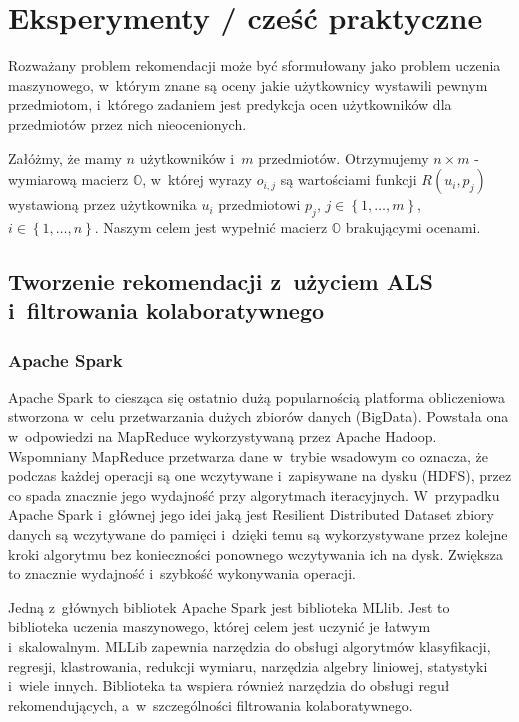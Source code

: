 \documentclass[12pt,a4paper]{report}
\newcommand{\set}[1]{\left\lbrace {#1} \right\rbrace}
\begin{document}
\chapter{Eksperymenty / cześć praktyczne}

Rozważany problem rekomendacji może być sformułowany jako problem uczenia maszynowego, w~którym znane są oceny jakie użytkownicy wystawili pewnym przedmiotom, i~którego zadaniem jest predykcja ocen użytkowników dla przedmiotów przez nich nieocenionych. 

Załóżmy, że mamy $n$ użytkowników i~$m$ przedmiotów. Otrzymujemy $n \times m$ - wymiarową macierz $\mathbb{O}$, w~której wyrazy $o_{i,j}$ są wartościami funkcji $R(u_i,p_j)$ wystawioną przez użytkownika $u_i$ przedmiotowi $p_j$, $j \in \set{1, \ldots, m}$, $i \in \set{1, \ldots, n}$. Naszym celem jest wypełnić macierz $\mathbb{O}$ brakującymi ocenami. 


\section{Tworzenie rekomendacji z~użyciem ALS i~filtrowania kolaboratywnego}
\subsection{Apache Spark}
Apache Spark to ciesząca się ostatnio dużą popularnością platforma obliczeniowa stworzona w~celu przetwarzania dużych zbiorów danych (BigData). Powstała ona w~odpowiedzi na MapReduce wykorzystywaną przez Apache Hadoop. Wspomniany MapReduce przetwarza dane w~trybie wsadowym co oznacza, że podczas każdej operacji są one wczytywane i~zapisywane na dysku (HDFS), przez co spada znacznie jego wydajność przy algorytmach iteracyjnych. W~przypadku Apache Spark i~głównej jego idei jaką jest 
Resilient Distributed Dataset zbiory danych są wczytywane do pamięci i~dzięki temu są wykorzystywane przez kolejne kroki algorytmu bez konieczności ponownego wczytywania ich na dysk. Zwiększa to znacznie wydajność i~szybkość wykonywania operacji.

Jedną z~głównych bibliotek Apache Spark jest biblioteka MLlib. Jest to biblioteka uczenia maszynowego, której celem jest uczynić je łatwym i~skalowalnym. MLLib zapewnia narzędzia do obsługi algorytmów klasyfikacji, regresji, klastrowania, redukcji wymiaru, narzędzia algebry liniowej, statystyki i~wiele innych. Biblioteka ta wspiera również narzędzia do obsługi reguł rekomendujących, a~w~szczególności filtrowania kolaboratywnego.
\end{document}
